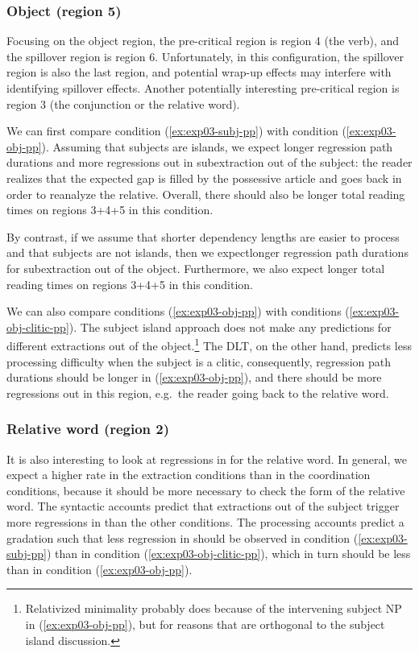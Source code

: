 \subsubsection{Object (region 5)}

Focusing on the object region, the pre-critical region is region 4 (the verb), and the spillover region is region 6. Unfortunately, in this configuration, the spillover region is also the last region, and potential wrap-up effects may interfere with identifying spillover effects. Another potentially interesting pre-critical region is region 3 (the conjunction or the relative word). 

We can first compare condition (\ref{ex:exp03-subj-pp}) with condition (\ref{ex:exp03-obj-pp}). Assuming that subjects are islands, we expect longer regression path durations and more regressions out in subextraction out of the subject: the reader realizes that the expected gap is filled by the possessive article and goes back in order to reanalyze the relative. Overall, there should also be longer total reading times on regions 3+4+5 in this condition. 

By contrast, if we assume that shorter dependency lengths are easier to process and that subjects are not islands, then we expectlonger regression path durations for subextraction out of the object. Furthermore, we also expect longer total reading times on regions 3+4+5 in this condition.

We can also compare conditions (\ref{ex:exp03-obj-pp}) with conditions (\ref{ex:exp03-obj-clitic-pp}). The subject island approach does not make any predictions for different extractions out of the object.\footnote{Relativized minimality probably does because of the intervening subject NP in (\ref{ex:exp03-obj-pp}), but for reasons that are orthogonal to the subject island discussion.} The DLT, on the other hand, predicts less processing difficulty when the subject is a clitic, consequently, regression path durations should be longer in (\ref{ex:exp03-obj-pp}), and there should be more regressions out in this region, e.g.\ the reader going back to the relative word. 

\subsubsection{Relative word (region 2)}

It is also interesting to look at regressions in for the relative word. In general, we expect a higher rate in the extraction conditions than in the coordination conditions, because it should be more necessary to check the form of the relative word. The syntactic accounts predict that extractions out of the subject trigger more regressions in than the other conditions. The processing accounts predict a gradation such that less regression in should be observed in condition (\ref{ex:exp03-subj-pp}) than in condition (\ref{ex:exp03-obj-clitic-pp}), which in turn should be less than in condition (\ref{ex:exp03-obj-pp}).

